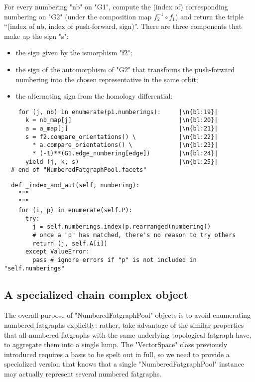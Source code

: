 For every numbering "nb" on "G1", compute the (index of)
corresponding numbering on "G2" (under the composition map
$f_2^{-1} \circ f_1$) and return the triple ``(index of nb, index of
push-forward, sign)''.
There are three components that make up the sign "s":
\begin{itemize}
\item the sign given by the ismorphism "f2";
\item the sign of the automorphism of "G2" that transforms the
  push-forward numbering into the chosen representative in the same
  orbit;
\item the alternating sign from the homology differential:
\end{itemize}
\begin{lstlisting}
    for (j, nb) in enumerate(p1.numberings):     |\n{bl:19}|
      k = nb_map[j]                              |\n{bl:20}|
      a = a_map[j]                               |\n{bl:21}|
      s = f2.compare_orientations() \            |\n{bl:22}|
        * a.compare_orientations() \             |\n{bl:23}|
        * (-1)**(G1.edge_numbering[edge])        |\n{bl:24}|
      yield (j, k, s)                            |\n{bl:25}|
  # end of "NumberedFatgraphPool.facets"

\end{lstlisting}

\begin{lstlisting}
  def _index_and_aut(self, numbering):
    """
    """
    for (i, p) in enumerate(self.P):
      try:
        j = self.numberings.index(p.rearranged(numbering))
        # once a "p" has matched, there's no reason to try others
        return (j, self.A[i])
      except ValueError:
        pass # ignore errors if "p" is not included in "self.numberings"
\end{lstlisting}

\subsection{A specialized chain complex object}
\label{sec:MgnChainComplex}

The overall purpose of "NumberedFatgraphPool" objects is to avoid
enumerating numbered fatgraphs explicitly: rather, take advantage of
the similar properties that all numbered fatgraphs with the same
underlying topological fatgraph have, to aggregate them into a single
lump.   The "VectorSpace" class previously introduced requires a basis
to be spelt out in full, so we need to provide a specialized version
that knows that a single "NumberedFatgraphPool" instance may actually
represent several numbered fatgraphs.  

